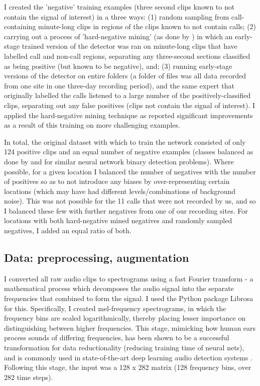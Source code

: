 \documentclass[11pt]{article}
\begin{document}
I created the 'negative' training examples (three second clips known to not contain the signal of interest) in a three ways: (1) random sampling from call-containing minute-long clips in regions of the clips known to not contain calls; (2) carrying out a process of 'hard-negative mining' (as done by \cite{mac2018bat}) in which an early-stage trained version of the detector was ran on minute-long clips that have labelled call and non-call regions, separating any three-second sections classified as being positive (but known to be negative), and; (3) running early-stage versions of the detector on entire folders (a folder of files was all data recorded from one site in one three-day recording period), and the same expert that originally labelled the calls listened to a large number of the positively-classified clips, separating out any false positives (clips not contain the signal of interest). I applied the hard-negative mining technique as \cite{mac2018bat} reported significant improvements as a result of this training on more challenging examples. 

In total, the original dataset with which to train the network consisted of only 124 positive clips and an equal number of negative examples (classes balanced as done by \cite{mac2018bat} and \cite{kiskin2017mosquito} for similar neural network binary detection problems). Where possible, for a given location I balanced the number of negatives with the number of positives so as to not introduce any biases by over-representing certain locations (which may have had different levels/combinations of background noise). This was not possible for the 11 calls that were not recorded by us, and so I balanced these few with further negatives from one of our recording sites. For locations with both hard-negative mined negatives and randomly sampled negatives, I added an equal ratio of both.   

\subsection{Data: preprocessing, augmentation}

I converted all raw audio clips to spectrograms using a fast Fourier transform - a mathematical process which decomposes the audio signal into the separate frequencies that combined to form the signal. I used the Python package Librosa \citep{brian_mcfee_2018_1342708} for this. Specifically, I created mel-frequency spectrograms, in which the frequency bins are scaled logarithmically, thereby placing lesser importance on distinguishing between higher frequencies. This stage, mimicking how human ears process sounds of differing frequencies, has been shown to be a successful transformation for data reductionality (reducing training time of neural nets), and is commonly used in state-of-the-art deep learning audio detection systems \citep{stowell2018automatic}. Following this stage, the input was a 128 x 282 matrix (128 frequency bins, over 282 time steps).
\end{document}
